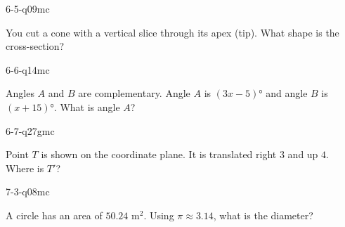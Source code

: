 \begin{practiceQuestion}{6-5-q09}{mc}
\begin{questionText}
You cut a cone with a vertical slice through its apex (tip). What shape is the cross-section?
\end{questionText}
\end{practiceQuestion}

\begin{practiceQuestion}{6-6-q14}{mc}
\begin{questionText}
Angles $A$ and $B$ are complementary. Angle $A$ is $(3x - 5)°$ and angle $B$ is $(x + 15)°$. What is angle $A$?
\end{questionText}
\end{practiceQuestion}

\begin{practiceQuestion}{6-7-q27}{gmc}
\begin{questionText}
Point $T$ is shown on the coordinate plane. It is translated right $3$ and up $4$. Where is $T'$?

\begin{center}
\end{center}
\end{questionText}
\end{practiceQuestion}

\begin{practiceQuestion}{7-3-q08}{mc}
\begin{questionText}
A circle has an area of $50.24$ m$^2$. Using $\pi \approx 3.14$, what is the diameter?
\end{questionText}
\end{practiceQuestion}

